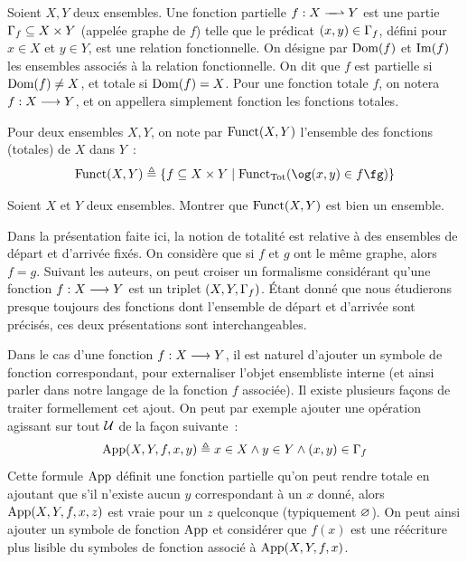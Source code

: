 \begin{definition}[Fonction]
  Soient $X,Y$ deux ensembles. Une fonction partielle
  $\makeFunNamePartial{f}{X}{Y}$ est
  une partie $\Gamma_{f}\subseteq X \times Y$ (appelée graphe de $f$) telle
  que le prédicat $(x,y)\in \Gamma_{f}$, défini pour $x\in X$ et $y\in Y$, est
  une relation fonctionnelle. On désigne par $\operatorname{Dom}(f)$ et $\operatorname{Im}(f)$ les ensembles
  associés à la relation fonctionnelle. On dit que $f$ est partielle si
  $\operatorname{Dom}(f) \neq X$, et totale si $\operatorname{Dom}(f) = X$. Pour une fonction totale
  $f$, on notera $f : \displaystyle X \longrightarrow Y$, et on appellera simplement
  \og fonction\fg{} les fonctions totales.

  Pour deux ensembles $X,Y$, on note par $\operatorname{Funct}(X,Y)$ l'ensemble des fonctions
  (totales) de $X$ dans $Y$~:
  \[\Funct(X,Y) \defeq
  \compr{f \subseteq X \times Y}{\FunTot(\ogM (x,y)\in f\fgM)}\]
\end{definition}

\begin{exercise}
  Soient $X$ et $Y$ deux ensembles. Montrer que $\operatorname{Funct}(X,Y)$ est bien un
  ensemble.
\end{exercise}

\begin{remark}
  Dans la présentation faite ici, la notion de totalité est relative à des
  ensembles de départ et d'arrivée fixés. On considère que si $f$ et $g$ ont
  le même graphe, alors $f = g$. Suivant les auteurs, on peut croiser un
  formalisme considérant qu'une fonction $f : \displaystyle X \longrightarrow Y$ est un triplet
  $(X,Y,\Gamma_{f})$. \'Etant donné que nous étudierons presque toujours des
  fonctions dont l'ensemble de départ et d'arrivée sont précisés, ces deux
  présentations sont interchangeables.
\end{remark}

\begin{notation}
  Dans le cas d'une fonction $f : \displaystyle X \longrightarrow Y$, il est naturel d'ajouter
  un symbole de fonction correspondant, pour externaliser l'objet ensembliste
  interne (et ainsi parler dans notre langage de la fonction $f$ associée).
  Il existe plusieurs façons de traiter formellement cet ajout. On peut
  par exemple ajouter une opération agissant sur tout $\mathcal{U}$ de la façon
  suivante~:
  \[\operatorname{App}(X,Y,f,x,y) \triangleq x \in X \land y \in Y \land (x,y) \in \Gamma_{f}\]
  Cette formule $\operatorname{App}$ définit une fonction partielle qu'on peut rendre
  totale  en ajoutant que s'il n'existe aucun $y$ correspondant
  à un $x$ donné, alors $\operatorname{App}(X,Y,f,x,z)$ est vraie pour un $z$
  quelconque (typiquement $\varnothing$). On peut ainsi ajouter un symbole de fonction
  $\operatorname{App}$ et considérer que $f(x)$ est une réécriture plus lisible du symboles de
  fonction associé à $\operatorname{App}(X,Y,f,x)$.
\end{notation}

